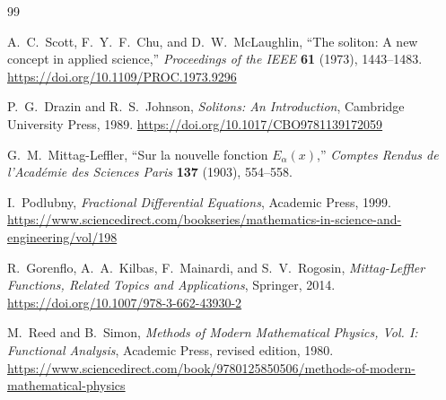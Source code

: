 \begin{thebibliography}{99}

A.~C.~Scott, F.~Y.~F.~Chu, and D.~W.~McLaughlin,
``The soliton: A new concept in applied science,''
\emph{Proceedings of the IEEE} \textbf{61} (1973), 1443--1483.
\url{https://doi.org/10.1109/PROC.1973.9296}

P.~G.~Drazin and R.~S.~Johnson,
\emph{Solitons: An Introduction},
Cambridge University Press, 1989.
\url{https://doi.org/10.1017/CBO9781139172059}

G.~M.~Mittag-Leffler,
``Sur la nouvelle fonction $E_{\alpha}(x)$,''
\emph{Comptes Rendus de l'Acad\'emie des Sciences Paris} \textbf{137} (1903), 554--558.

I.~Podlubny,
\emph{Fractional Differential Equations},
Academic Press, 1999.
\url{https://www.sciencedirect.com/bookseries/mathematics-in-science-and-engineering/vol/198}

R.~Gorenflo, A.~A.~Kilbas, F.~Mainardi, and S.~V.~Rogosin,
\emph{Mittag-Leffler Functions, Related Topics and Applications},
Springer, 2014.
\url{https://doi.org/10.1007/978-3-662-43930-2}

M.~Reed and B.~Simon,
\emph{Methods of Modern Mathematical Physics, Vol. I: Functional Analysis},
Academic Press, revised edition, 1980.
\url{https://www.sciencedirect.com/book/9780125850506/methods-of-modern-mathematical-physics}

\end{thebibliography}
